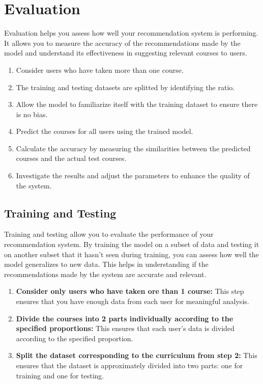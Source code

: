 \newpage

\section{Evaluation}

Evaluation helps you assess how well your recommendation system is performing. It 
allows you to measure the accuracy of the recommendations made by the model and 
understand its effectiveness in suggesting relevant courses to users.

\begin{enumerate}
    \item \textsf{Consider users who have taken more than one course.}
    \item \textsf{The training and testing datasets are splitted by identifying the ratio.}
    \item \textsf{Allow the model to familiarize itself with the training dataset to ensure there is no bias.}
    \item \textsf{Predict the courses for all users using the trained model.}
    \item \textsf{Calculate the accuracy by measuring the similarities between the predicted courses and the actual test courses.}
    \item \textsf{Investigate the results and adjust the parameters to enhance the quality of the system.}
\end{enumerate}

\subsection{Training and Testing}

Training and testing allow you to evaluate the performance of your recommendation system. 
By training the model on a subset of data and testing it on another subset that it hasn't 
seen during training, you can assess how well the model generalizes to new data. This helps 
in understanding if the recommendations made by the system are accurate and relevant.

\begin{enumerate}
    \item \textsf{\textbf{Consider only users who have taken ore than 1 course: }
    This step ensures that you have enough data from each user for meaningful analysis.}
    \item \textsf{\textbf{Divide the courses into 2 parts individually according to the specified proportions: }
    This ensures that each user's data is divided according to the specified proportion.}
    \item \textsf{\textbf{Split the dataset corresponding to the curriculum from step 2: }
        This ensures that the dataset is approximately divided into two parts: one for training and one for testing.}
\end{enumerate}

